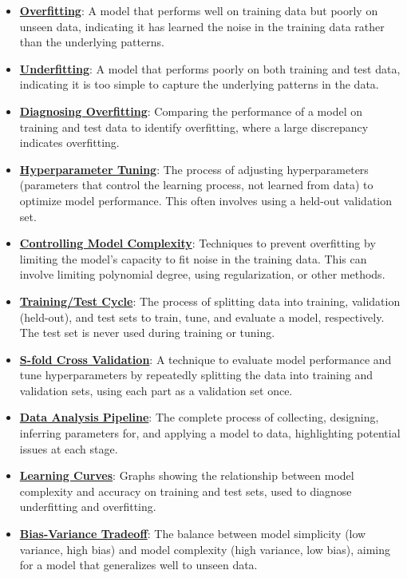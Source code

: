 \documentclass{article}%
\begin{document}
\begin{itemize}[leftmargin=*]%
\item \href{https://www.math.purdue.edu/~yipn/351/10L1-CrossValidation.pdf#page=2}{\textbf{Overfitting}}: A model that performs well on training data but poorly on unseen data, indicating it has learned the noise in the training data rather than the underlying patterns.%
\item \href{https://www.math.purdue.edu/~yipn/351/10L1-CrossValidation.pdf#page=21}{\textbf{Underfitting}}: A model that performs poorly on both training and test data, indicating it is too simple to capture the underlying patterns in the data.%
\item \href{https://www.math.purdue.edu/~yipn/351/10L1-CrossValidation.pdf#page=12}{\textbf{Diagnosing Overfitting}}: Comparing the performance of a model on training and test data to identify overfitting, where a large discrepancy indicates overfitting.%
\item \href{https://www.math.purdue.edu/~yipn/351/10L1-CrossValidation.pdf#page=14}{\textbf{Hyperparameter Tuning}}: The process of adjusting hyperparameters (parameters that control the learning process, not learned from data) to optimize model performance. This often involves using a held-out validation set.%
\item \href{https://www.math.purdue.edu/~yipn/351/10L1-CrossValidation.pdf#page=16}{\textbf{Controlling Model Complexity}}: Techniques to prevent overfitting by limiting the model's capacity to fit noise in the training data. This can involve limiting polynomial degree, using regularization, or other methods.%
\item \href{https://www.math.purdue.edu/~yipn/351/10L1-CrossValidation.pdf#page=5}{\textbf{Training/Test Cycle}}: The process of splitting data into training, validation (held-out), and test sets to train, tune, and evaluate a model, respectively. The test set is never used during training or tuning.%
\item \href{https://www.math.purdue.edu/~yipn/351/10L1-CrossValidation.pdf#page=25}{\textbf{S{-}fold Cross Validation}}: A technique to evaluate model performance and tune hyperparameters by repeatedly splitting the data into training and validation sets, using each part as a validation set once.%
\item \href{https://www.math.purdue.edu/~yipn/351/10L1-CrossValidation.pdf#page=26}{\textbf{Data Analysis Pipeline}}: The complete process of collecting, designing, inferring parameters for, and applying a model to data, highlighting potential issues at each stage.%
\item \href{https://www.math.purdue.edu/~yipn/351/10L1-CrossValidation.pdf#page=20}{\textbf{Learning Curves}}: Graphs showing the relationship between model complexity and accuracy on training and test sets, used to diagnose underfitting and overfitting.%
\item \href{https://www.math.purdue.edu/~yipn/351/10L1-CrossValidation.pdf#page=4}{\textbf{Bias{-}Variance Tradeoff}}: The balance between model simplicity (low variance, high bias) and model complexity (high variance, low bias), aiming for a model that generalizes well to unseen data.%
\end{itemize}%
\end{document}
